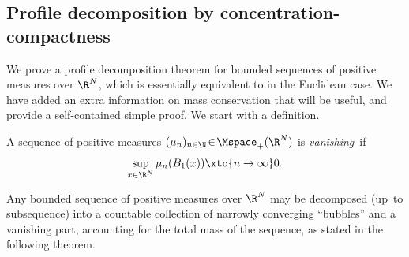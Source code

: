 \subsection{Profile decomposition by concentration-compactness}

We prove a profile decomposition theorem for bounded sequences of positive measures over $\R^N$, which is essentially equivalent to \cite[Th.\,1.5]{marisProfileDecompositionSequences2014} in the Euclidean case. We have added an extra information on mass conservation that will be useful, and provide a self-contained simple proof. We start with a definition.

\begin{definition}\label{DefinitionVanishing}
A sequence of positive measures $(\mu_n)_{n\in\N} \!\in\! \Mspace_+(\R^N)$ is \emph{vanishing}~if
\[\sup_{x\in \R^N} \mu_n(B_1(x)) \xto{n\to \infty} 0.\]
\end{definition}

Any bounded sequence of positive measures over $\R^N$ may be decomposed (up~to subsequence) into a countable collection of narrowly converging \enquote{bubbles} and a vanishing part, accounting for the total mass of the sequence, as stated in the following theorem.

